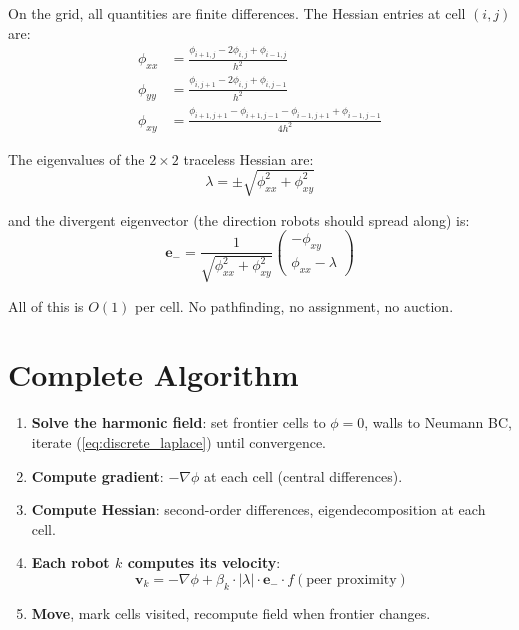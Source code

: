 \documentclass[11pt]{article}
\begin{document}
On the grid, all quantities are finite differences.  The Hessian
entries at cell $(i,j)$ are:
\begin{align}
    \phi_{xx} &= \frac{\phi_{i+1,j} - 2\phi_{i,j}
    + \phi_{i-1,j}}{h^2} \\
    \phi_{yy} &= \frac{\phi_{i,j+1} - 2\phi_{i,j}
    + \phi_{i,j-1}}{h^2} \\
    \phi_{xy} &= \frac{\phi_{i+1,j+1} - \phi_{i+1,j-1}
    - \phi_{i-1,j+1} + \phi_{i-1,j-1}}{4h^2}
\end{align}

The eigenvalues of the $2 \times 2$ traceless Hessian are:
\begin{equation}
    \lambda = \pm\sqrt{\phi_{xx}^2 + \phi_{xy}^2}
\end{equation}

and the divergent eigenvector (the direction robots should spread
along) is:
\begin{equation}
    \mathbf{e}_- = \frac{1}{\sqrt{\phi_{xx}^2 + \phi_{xy}^2}}
    \begin{pmatrix}
        -\phi_{xy} \\
        \phi_{xx} - \lambda
    \end{pmatrix}
\end{equation}

All of this is $O(1)$ per cell.  No pathfinding, no assignment,
no auction.

\section{Complete Algorithm}

\begin{enumerate}
    \item \textbf{Solve the harmonic field}: set frontier cells to
    $\phi = 0$, walls to Neumann BC, iterate
    (\ref{eq:discrete_laplace}) until convergence.
    \item \textbf{Compute gradient}: $-\nabla\phi$ at each cell
    (central differences).
    \item \textbf{Compute Hessian}: second-order differences,
    eigendecomposition at each cell.
    \item \textbf{Each robot $k$ computes its velocity}:
    \[
        \mathbf{v}_k = -\nabla\phi + \beta_k \cdot |\lambda|
        \cdot \mathbf{e}_- \cdot f(\text{peer proximity})
    \]
    \item \textbf{Move}, mark cells visited, recompute field
    when frontier changes.
\end{enumerate}
\end{document}
